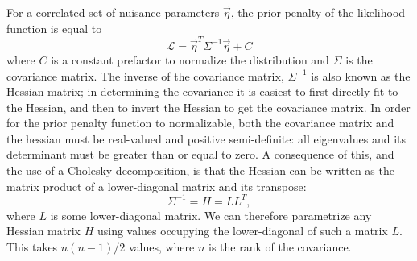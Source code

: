 \documentclass[main.tex]{subfiles}
\begin{document}
For a correlated set of nuisance parameters $\vec{\eta}$, the prior penalty of the likelihood function is equal to 
\begin{equation}
    \mathcal{L} = \vec{\eta}^{T} \Sigma^{-1} \vec{\eta} + C
\end{equation} 
where $C$ is a constant prefactor to normalize the distribution and $\Sigma$ is the covariance matrix.
The inverse of the covariance matrix, $\Sigma^{-1}$ is also known as the Hessian matrix; in determining the covariance it is easiest to first directly fit to the Hessian, and then to invert the Hessian to get the covariance matrix.
In order for the prior penalty function to normalizable, both the covariance matrix and the hessian must be real-valued and positive semi-definite: all eigenvalues and its determinant must be greater than or equal to zero. 
A consequence of this, and the use of a Cholesky decomposition, is that the Hessian can be written as the matrix product of a lower-diagonal matrix and its transpose:
\begin{equation}
    \Sigma^{-1} = H = LL^{T},
\end{equation} 
where $L$ is some lower-diagonal matrix. 
We can therefore parametrize any Hessian matrix $H$ using values occupying the lower-diagonal of such a matrix $L$. This takes $n(n-1)/2$ values, where $n$ is the rank of the covariance. 
\end{document}
